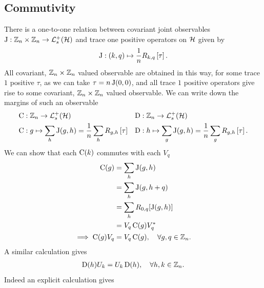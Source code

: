 \subsection{Commutivity} 
There is a one-to-one relation between covariant joint observables $\opj:\cyc[n]\times\cyc[n]\to\posops[\hcal]$ and trace one positive operators on $\mathcal{H}$ given by 
\begin{align}
  \operatorname{J}:(k,q)\mapsto \frac{1}{n}R_{k,q}\left[\tau\right].
\end{align}
All covariant, $\cyc[n]\times\cyc[n]$ valued observable are obtained in this way, for some trace $1$ positive $\tau$, as we can take $\tau = n\operatorname{J}(0,0)$, and all trace $1$ positive operators give rise to some covariant, $\cyc[n]\times\cyc[n]$ valued observable. We can write down the margins of such an observable
\begin{align}
  \opc&:\cyc[n] \to \posops[\hcal] & \opd&:\cyc[n] \to \posops[\hcal]\\
  \opc&:g\mapsto \sum_h \opj(g,h) = \frac{1}{n}\sum_h R_{g,h}\left[\tau\right] &  \opd&:h\mapsto \sum_g \opj(g,h) = \frac{1}{n}\sum_g R_{g,h}\left[\tau\right].
  \label{eqn:write-down-margins}
\end{align}
We can show that each $\operatorname{C}(k)$ commutes with each $V_q$
\begin{align}
  \opc(g) &= \sum_h \opj(g,h)\\
          &= \sum_h \opj(g, h+q)\\
          &= \sum_h R_{0,q}[\opj(g,h)]\\
          &= V_q \opc(g) V_q^*\\
  \implies \opc(g) V_q &= V_q \opc(g), \quad \forall g,q\in \cyc[n].
\end{align}
A similar calculation gives
\begin{align}
  \opd(h) U_k = U_k \opd(h), \quad \forall h,k\in \cyc[n].
\end{align}
Indeed an explicit calculation gives
